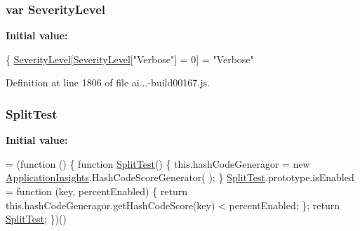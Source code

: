 \subsubsection[{\texorpdfstring{Severity\+Level}{SeverityLevel}}]{\setlength{\rightskip}{0pt plus 5cm}var Severity\+Level}\hypertarget{_scripts_2ai_80_822_89-build00167_8js_a09d2f6aeadb27dbc0a4d4b8964cba33c}{}\label{_scripts_2ai_80_822_89-build00167_8js_a09d2f6aeadb27dbc0a4d4b8964cba33c}
{\bfseries Initial value\+:}
\begin{DoxyCode}
\{
        \hyperlink{obj_2_release_2_package_2_package_tmp_2_scripts_2ai_80_822_89-build00167_8js_a09d2f6aeadb27dbc0a4d4b8964cba33c}{SeverityLevel}[\hyperlink{obj_2_release_2_package_2_package_tmp_2_scripts_2ai_80_822_89-build00167_8js_a09d2f6aeadb27dbc0a4d4b8964cba33c}{SeverityLevel}[\textcolor{stringliteral}{"Verbose"}] = 0] = \textcolor{stringliteral}{"Verbose"}
\end{DoxyCode}


Definition at line 1806 of file ai...-\/build00167.\+js.

\subsubsection[{\texorpdfstring{Split\+Test}{SplitTest}}]{ Split\+Test}\hypertarget{_scripts_2ai_80_822_89-build00167_8js_a27b27014c3d42240b906d918dc25c813}{}\label{_scripts_2ai_80_822_89-build00167_8js_a27b27014c3d42240b906d918dc25c813}
{\bfseries Initial value\+:}
\begin{DoxyCode}
= (\textcolor{keyword}{function} () \{
            \textcolor{keyword}{function} \hyperlink{obj_2_release_2_package_2_package_tmp_2_scripts_2ai_80_822_89-build00167_8js_a27b27014c3d42240b906d918dc25c813}{SplitTest}() \{
                this.hashCodeGeneragor = \textcolor{keyword}{new} \hyperlink{obj_2_release_2_package_2_package_tmp_2_scripts_2ai_80_822_89-build00167_8js_aa415ef4f8cdd699689ef4b61db7656d8}{ApplicationInsights}.HashCodeScoreGenerator(
      );
            \}
            \hyperlink{obj_2_release_2_package_2_package_tmp_2_scripts_2ai_80_822_89-build00167_8js_a27b27014c3d42240b906d918dc25c813}{SplitTest}.prototype.isEnabled = \textcolor{keyword}{function} (key, percentEnabled) \{
                \textcolor{keywordflow}{return} this.hashCodeGeneragor.getHashCodeScore(key) < percentEnabled;
            \};
            \textcolor{keywordflow}{return} \hyperlink{obj_2_release_2_package_2_package_tmp_2_scripts_2ai_80_822_89-build00167_8js_a27b27014c3d42240b906d918dc25c813}{SplitTest};
        \})()
\end{DoxyCode}


